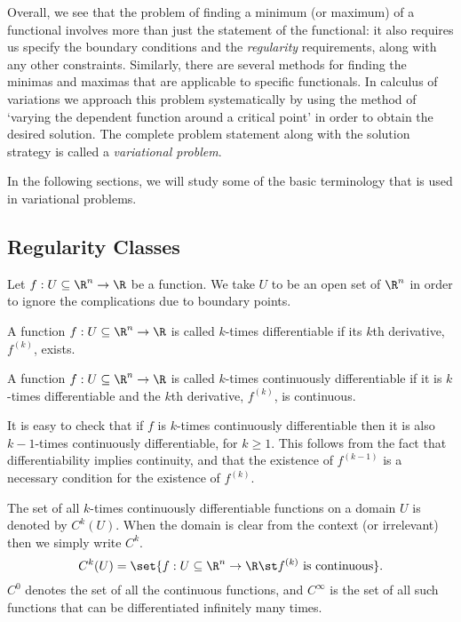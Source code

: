 Overall, we see that the problem of finding a minimum (or maximum) of a functional involves more than just the statement of the functional: it also requires us specify the boundary conditions and the \emph{regularity} requirements, along with any other constraints. Similarly, there are several methods for finding the minimas and maximas that are applicable to specific functionals. In calculus of variations we approach this problem systematically by using the method of `varying the dependent function around a critical point' in order to obtain the desired solution. The complete problem statement along with the solution strategy is called a \emph{variational problem}.

In the following sections, we will study some of the basic terminology that is used in variational problems.

\subsection{Regularity Classes}
Let $f:U \subseteq \R^n \to \R$ be a function. We take $U$ to be an open set of $\R^n$ in order to ignore the complications due to boundary points.

\begin{ndfn}
  A function $f:U \subseteq \R^n \to \R$ is called $k$-times differentiable if its $k$th derivative, $f^{(k)}$, exists.
\end{ndfn}
\begin{ndfn}
  A function $f:U \subseteq \R^n \to \R$ is called $k$-times continuously differentiable if it is $k$-times differentiable and the $k$th derivative, $f^{(k)}$, is continuous.
\end{ndfn}
It is easy to check that if $f$ is $k$-times continuously differentiable then it is also $k-1$-times continuously differentiable, for $k \geq 1$. This follows from the fact that differentiability implies continuity, and that the existence of $f^{(k-1)}$ is a necessary condition for the existence of $f^{(k)}$.

The set of all $k$-times continuously differentiable functions on a domain $U$ is denoted by $C^{k}(U)$. When the domain is clear from the context (or irrelevant) then we simply write $C^{k}$.
\begin{equation}
  C^{k}(U) = \set{f:U\subseteq\R^n \to \R \st f^{(k)}\text{ is continuous}}.
\end{equation}
$C^{0}$ denotes the set of all the continuous functions, and $C^{\infty}$ is the set of all such functions that can be differentiated infinitely many times.

